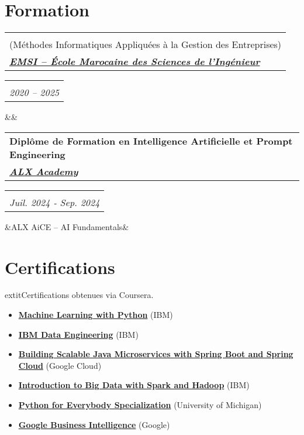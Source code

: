 \documentclass[10pt,a4paper,sans]{moderncv}
\makeatletter
\newcommand*{\customcventry}[7][.10em]{%
\begin{tabular}{@{}l}
    {\bfseries #4} \\
    {\itshape #3}
\end{tabular}
\hfill
\begin{tabular}{l@{}}
    {\bfseries #5} \\
    {\itshape #2}
\end{tabular}
\ifx&#7&%
\else{\\
\begin{minipage}{\maincolumnwidth}%
    \footnotesize#7%
\end{minipage}}\fi%
\par\addvspace{#1}
}
\makeatother
\begin{document}
\vspace{-16pt}
\section{\fontsize{11}{12.1}\selectfont Formation}
\vspace{-4pt}
\customcventry{2020 -- 2025}{\href{https://emsi.ma}{\textbf{EMSI – École Marocaine des Sciences de l’Ingénieur}}}{Master MIAGE Ingénierie Logicielle et Réseaux \\ (Méthodes Informatiques Appliquées à la Gestion des Entreprises)}{}{}{}
\customcventry{Juil. 2024 ‐ Sep. 2024}{\href{https://www.alxafrica.com}{\textbf{ALX Academy}}}{Diplôme de Formation en Intelligence Artificielle et Prompt Engineering}{}{}{ALX AiCE – AI Fundamentals}

\vspace{-18pt}
\section{\fontsize{11}{12.1}\selectfont Certifications}
\vspace{-5pt}
    extit{Certifications obtenues via Coursera.}
\begin{itemize}[leftmargin=0.3cm, itemsep=-2pt, topsep=0pt, partopsep=0pt, parsep=0pt]
    \item \textbf{\href{https://www.coursera.org/account/accomplishments/verify/G178XXP17WQA}{Machine Learning with Python}} (IBM)
    \item \textbf{\href{https://www.coursera.org/account/accomplishments/records/M5RKGX36BAVA}{IBM Data Engineering}} (IBM)
    \item \textbf{\href{https://google.com}{Building Scalable Java Microservices with Spring Boot and Spring Cloud}} (Google Cloud)
    \item \textbf{\href{https://www.coursera.org/account/accomplishments/verify/EK5SJM3YM7PX}{Introduction to Big Data with Spark and Hadoop}} (IBM)
    \item \textbf{\href{https://www.coursera.org/account/accomplishments/specialization/B4RCUAYCUG49}{Python for Everybody Specialization}} (University of Michigan)
    \item \textbf{\href{https://www.coursera.org/account/accomplishments/records/G867SJLRFQS2}{Google Business Intelligence}} (Google)
\end{itemize}

\vspace{-19pt}
\end{document}
